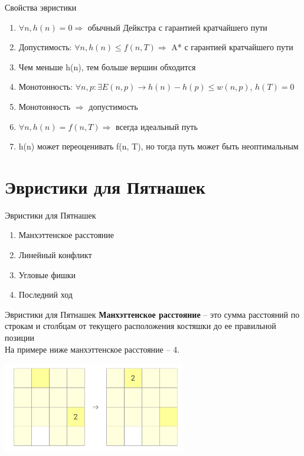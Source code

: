 \documentclass[10pt]{beamer}
\begin{document}
\begin{frame}[fragile]{Свойства эвристики}
\begin{enumerate}
    \item $\forall n, h(n) = 0 \Rightarrow$ обычный Дейкстра с гарантией кратчайшего пути
    \item Допустимость: $\forall n, h(n) \leq f(n, T) \Rightarrow$ A* с гарантией кратчайшего пути
    \item Чем меньше h(n), тем больше вершин обходится
    \item Монотонность: $\forall n, p: \exists E(n, p) \rightarrow h(n)-h(p) \leq w(n, p)$, $h(T) = 0$
    \item Монотонность $\Rightarrow$ допустимость
    \item $\forall n, h(n) = f(n, T) \Rightarrow$ всегда идеальный путь
    \item h(n) может переоценивать f(n, T), но тогда путь может быть неоптимальным
\end{enumerate}
\end{frame}

\section{Эвристики для Пятнашек}

\begin{frame}[fragile]{Эвристики для Пятнашек}
\begin{enumerate}
    \item Манхэттенское расстояние
    \item Линейный конфликт
    \item Угловые фишки
    \item Последний ход
\end{enumerate}
\end{frame}

\begin{frame}[fragile]{Эвристики для Пятнашек}
\textbf{Манхэттенское расстояние} -- это сумма расстояний по строкам и столбцам от текущего расположения костяшки до ее правильной позиции \\
На примере ниже манхэттенское расстояние -- 4.
\begin{center}
\includegraphics[width=8cm]{Term_2/Source/images/manhattan_15.png}
\end{center}
\end{frame}
\end{document}
